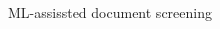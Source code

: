 \documentclass[9pt,aspectratio=169]{beamer}
\begin{document}
\begin{frame}{ML-assissted document screening}
\begin{columns}
\begin{column}{0.382\linewidth}
\begin{figure}
		\end{figure}
	\end{column}
\end{columns}

\end{frame}
\end{document}
